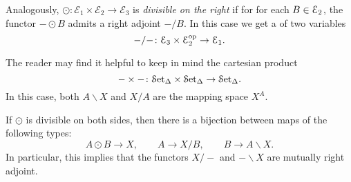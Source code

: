 \documentclass[main.tex]{subfiles}
\begin{document}
Analogously, $\odot\colon \mathcal{E}_{1} \times \mathcal{E}_{2} \to \mathcal{E}_{3}$ is \emph{divisible on the right} if for for each $B \in \mathcal{E}_{2}$, the functor $- \odot B$ admits a right adjoint $- / B$. In this case we get a of two variables
\begin{equation*}
  - / -\colon \mathcal{E}_{3} \times \mathcal{E}_{2}^{\mathrm{op}} \to \mathcal{E}_{1}.
\end{equation*}

\begin{example}
  The reader may find it helpful to keep in mind the cartesian product 
  \begin{equation*}
    - \times -\colon \mathcal{S}\mathrm{et}_{\Delta} \times \mathcal{S}\mathrm{et}_{\Delta} \to \mathcal{S}\mathrm{et}_{\Delta}. 
  \end{equation*}
  In this case, both $A \backslash X$ and $X / A$ are the mapping space $X^{A}$.
\end{example}

If $\odot$ is divisible on both sides, then there is a bijection between maps of the following types:
\begin{equation*}
  A \odot B \to X,\qquad A \to X / B,\qquad B \to A \backslash X.
\end{equation*}
In particular, this implies that the functors $X / -$ and $- \backslash X$ are mutually right adjoint.
\end{document}
